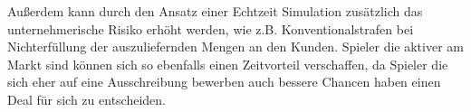 \par Außerdem kann durch den Ansatz einer Echtzeit Simulation zusätzlich das unternehmerische Risiko erhöht werden, wie z.B. Konventionalstrafen bei Nichterfüllung der auszuliefernden Mengen an den Kunden. Spieler die aktiver am Markt sind können sich so ebenfalls einen Zeitvorteil verschaffen, da Spieler die sich eher auf eine Ausschreibung bewerben auch bessere Chancen haben einen Deal für sich zu entscheiden.